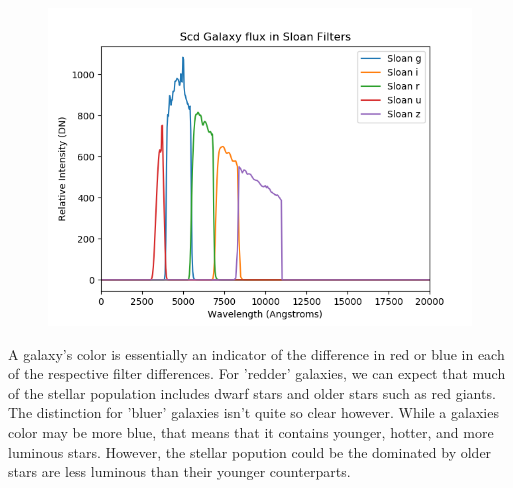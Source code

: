 \documentclass[12pt]{article}
\begin{document}
\begin{center}
\begin{figure}[H]
	\includegraphics[scale=0.5]{Scd_sloan.png}
	\end{figure}
\end{center}

A galaxy's color is essentially an indicator of the difference in red or blue in each of the respective filter differences. For 'redder' galaxies, we can expect that much of the stellar population includes dwarf stars and older stars such as red giants. The distinction for 'bluer' galaxies isn't quite so clear however. While a galaxies color may be more blue, that means that it contains younger, hotter, and more luminous stars. However, the stellar popution could be the dominated by older stars are less luminous than their younger counterparts. 
\end{document}
